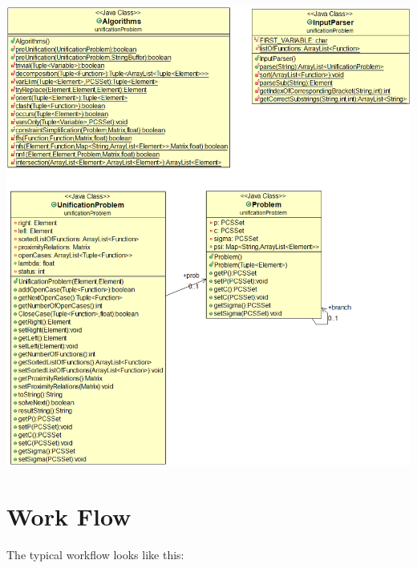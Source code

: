 \documentclass{article}
\begin{document}
\newpage
\includegraphics[scale=0.5]{UnificationProblemModel}

\section{Work Flow}
The typical workflow looks like this:

%




%


\end{document}
